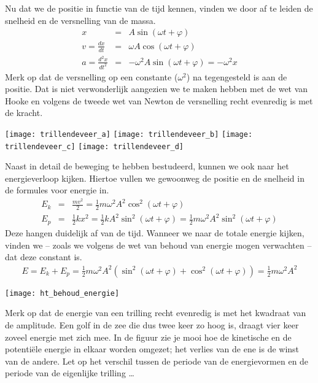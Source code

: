 \documentclass{ximera}
\begin{document}
	Nu dat we de positie in functie van de tijd kennen, vinden we door af te leiden de snelheid en de versnelling van de massa. 
	\begin{eqnarray*}
	x&=&A\sin(\omega t+\varphi)\\[3mm]
	v=\frac{dx}{dt}&=&\omega A\cos(\omega t+\varphi)\\[3mm]
	a=\frac{d^2x}{dt^2}&=&-\omega^2A\sin(\omega t+\varphi)=-\omega^2x
	\end{eqnarray*}
	Merk op dat de versnelling op een constante ($\omega^2$) na tegengesteld is aan de positie. Dat is niet verwonderlijk aangezien we te maken hebben met de wet van Hooke en volgens de tweede wet van Newton de versnelling recht evenredig is met de kracht. 
	
	
	\begin{image}
		
		\texttt{[image: trillendeveer\_a]}
		\texttt{[image: trillendeveer\_b]}
		\texttt{[image: trillendeveer\_c]}
		\texttt{[image: trillendeveer\_d]}
		
	\end{image}
	
	\clearpage
	
	Naast in detail de beweging te hebben bestudeerd, kunnen we ook naar het energieverloop kijken. Hiertoe vullen we gewoonweg de positie en de snelheid in de formules voor energie in.
	\begin{eqnarray*}
	E_k&=&\frac{mv^2}{2}=\frac{1}{2}m\omega^2A^2\cos^2(\omega t+\varphi)\\
	E_p&=&\frac{1}{2}kx^2=\frac{1}{2}kA^2\sin^2(\omega t+\varphi)=\frac{1}{2}m\omega^2A^2\sin^2(\omega t+\varphi)
	\end{eqnarray*}
	Deze hangen duidelijk af van de tijd. Wanneer we naar de totale energie kijken, vinden we -- zoals we volgens de wet van behoud van energie mogen verwachten -- dat deze constant is.
	\begin{eqnarray*}
	E=E_k+E_p=\frac{1}{2}m\omega^2A^2\left(\sin^2(\omega t+\varphi)+\cos^2(\omega t+\varphi)\right)=\frac{1}{2}m\omega^2A^2
	\end{eqnarray*}
	\begin{image}
	
	\texttt{[image: ht\_behoud\_energie]}
	\end{image}
	Merk op dat de energie van een trilling recht evenredig is met het kwadraat van de amplitude. Een golf in de zee die dus twee keer zo hoog is, draagt vier keer zoveel energie met zich mee. In de figuur zie je mooi hoe de kinetische en de potenti\"ele energie in elkaar worden omgezet; het verlies van de ene is de winst van de andere. Let op het verschil tussen de periode van de energievormen en de periode van de eigenlijke trilling \ldots
	
	
\end{document}
